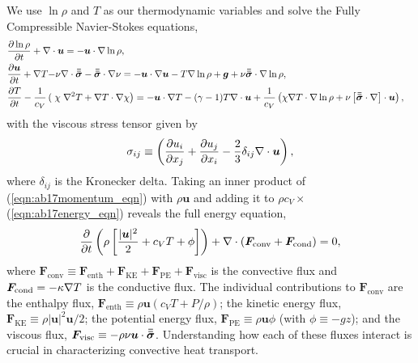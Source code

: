 We use $\ln \rho$ and $T$ as our thermodynamic variables and solve the Fully Compressible Navier-Stokes equations,
\begin{align}
&\begin{aligned}
&\frac{\partial \ln\rho}{\partial t} + \nabla\cdot\bm{u} 
    = -\bm{u}\cdot\nabla\ln\rho,
	\label{eqn:ab17continuity_eqn}
\end{aligned}\\
&\begin{aligned}
\frac{\partial\bm{u}}{\partial t} + \nabla T - 
&\nu\nabla\cdot\bm{\bar{\bar{\sigma}}} - \bm{\bar{\bar{\sigma}}}\cdot\nabla\nu =
-\bm{u}\cdot\nabla\bm{u} - T\nabla\ln\rho + \bm{g} + 
\nu\bm{\bar{\bar{\sigma}}}\cdot\nabla\ln\rho,
\label{eqn:ab17momentum_eqn}
\end{aligned}\\
&\begin{aligned}
\frac{\partial T}{\partial t} -\frac{1}{c_V}\left(\right.\chi&\left.
    \nabla^2 T + \nabla T\cdot\nabla\chi\right) =
	-\bm{u}\cdot\nabla T - (\gamma-1)T\nabla\cdot{\bm{u}}
	+ \frac{1}{c_V}\left(\chi\nabla T \cdot\nabla\ln\rho +
	\nu\left[\bm{\bar{\bar{\sigma}}}\cdot\nabla\right]\cdot\bm{u}\right), 
	\label{eqn:ab17energy_eqn}
\end{aligned}
\end{align}
with the viscous stress tensor given by
\begin{equation}
\sigma_{ij} \equiv \left(\frac{\partial u_i}{\partial x_j} + 
\frac{\partial u_j}{\partial x_i} - \frac{2}{3}\delta_{ij}\nabla\cdot\bm{u}\right),
	\label{eqn:ab17stress_tensor}
\end{equation}
where $\delta_{ij}$ is the Kronecker delta. 
Taking an inner product of (\ref{eqn:ab17momentum_eqn}) with $\rho\bm{u}$ and adding it to $\rho c_V\times$(\ref{eqn:ab17energy_eqn}) reveals the full energy equation,
\begin{equation}
\frac{\partial}{\partial t}\left(\rho\left[\frac{|\bm{u}|^2}{2} + c_V T + \phi\right]\right) +
\nabla\cdot\left( \bm{F}_{\text{conv}} + \bm{F}_{\text{cond}}\right) = 0,
	\label{eqn:ab17energy_eqn_full}
\end{equation}
where
$
\bm{F}_{\text{conv}} \equiv \bm{F}_{\text{enth}} + \bm{F}_{\text{KE}} + \bm{F}_{\text{PE}} + \bm{F}_{\text{visc}}
$
is the convective flux and $\bm{F}_{\text{cond}} = -\kappa \nabla T$ is the conductive flux.
The individual contributions to $\bm{F}_{\text{conv}}$ are the enthalpy flux, $\bm{F}_{\text{enth}} \equiv \rho\bm{u}(c_V T + P/\rho)$; the kinetic energy flux, $\bm{F}_{\text{KE}} \equiv \rho|\bm{u}|^2\bm{u}/2$; the potential energy flux, $\bm{F}_{\text{PE}} \equiv \rho\bm{u}\phi$ (with $\phi \equiv -gz$); and the viscous flux, $\bm{F}_{\text{visc}} \equiv -\rho\nu\bm{u}\cdot\bm{\bar{\bar{\sigma}}}$.
Understanding how each of these fluxes interact is crucial in characterizing convective heat transport.

